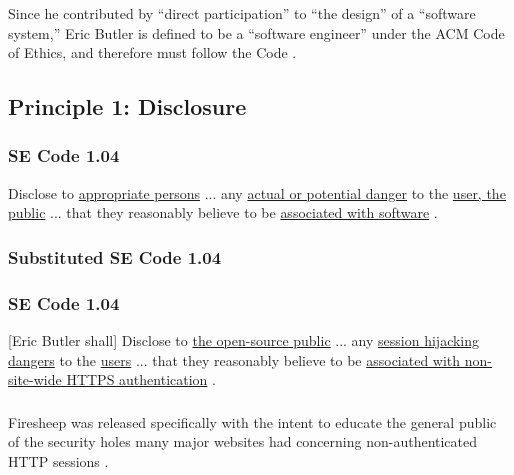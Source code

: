 \documentclass[11pt]{article}
\begin{document}
\begin{multicols}{2}
Since he contributed by ``direct participation'' to ``the design'' of a ``software system,'' Eric Butler is defined to be a ``software engineer'' under the ACM Code of Ethics, and therefore must follow the Code \cite{se-code}.

\subsection{Principle 1: Disclosure}
\subsubsection*{SE Code 1.04}
Disclose to \uline{appropriate persons} ... any \uline{actual or potential danger} to the \uline{user, the public} ... that they reasonably believe to be \uline{associated with software} \cite{se-code}. 

\subsubsection*{Substituted SE Code 1.04}
\subsubsection*{SE Code 1.04}
[Eric Butler shall] Disclose to \uline{the open-source public} ... any \uline{session hijacking dangers} to the \uline{users} ... that they reasonably believe to be \uline{associated with non-site-wide HTTPS authentication} \cite{se-code}. 

\subsubsection{}
Firesheep was released specifically with the intent to educate the general public of the security holes many major websites had concerning non-authenticated HTTP sessions \cite{eric-butler}.






\end{multicols}
\end{document}
